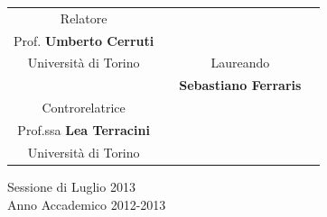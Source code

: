 \documentclass[a4paper,10pt,twoside]{book}
\begin{document}
\begin{titlepage}
\vspace{1cm}
\begin{figure}[!h]
\begin{center}
\end{center}
\end{figure}
\vspace{1cm}



\begin{tabular}{c p{3.3cm}c c}



Relatore & & { } \\
Prof. \textbf{Umberto Cerruti} & & \\
{\small Università di Torino} & & Laureando \\
{  } & &  \textbf{Sebastiano Ferraris}  \\
Controrelatrice & & { } \\
Prof.ssa \textbf{Lea Terracini} & & { }\\
{\small Università di Torino} & & { }\\


\end{tabular}
\vspace{1 cm}

\begin{center}
\large{Sessione di Luglio 2013 \\ Anno Accademico 2012-2013}
\end{center}
\par
\vfill\par
\clearpage
\endgroup


\end{titlepage}
\end{document}
